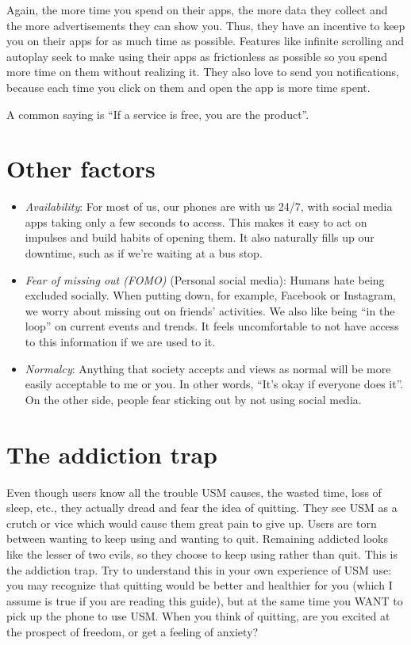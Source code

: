 \documentclass[
  openany]{book}
\providecommand{\tightlist}{%
  \setlength{\itemsep}{0pt}\setlength{\parskip}{0pt}}
\begin{document}
Again, the more time you spend on their apps, the more data they collect and the more advertisements they can show you. Thus, they have an incentive to keep you on their apps for as much time as possible. Features like infinite scrolling and autoplay seek to make using their apps as frictionless as possible so you spend more time on them without realizing it. They also love to send you notifications, because each time you click on them and open the app is more time spent.

A common saying is ``If a service is free, you are the product''.

\section{Other factors}\label{other-factors}

\begin{itemize}
\tightlist
\item
  \emph{Availability}: For most of us, our phones are with us 24/7, with social media apps taking only a few seconds to access. This makes it easy to act on impulses and build habits of opening them. It also naturally fills up our downtime, such as if we're waiting at a bus stop.
\item
  \emph{Fear of missing out (FOMO)} (Personal social media): Humans hate being excluded socially. When putting down, for example, Facebook or Instagram, we worry about missing out on friends' activities. We also like being ``in the loop'' on current events and trends. It feels uncomfortable to not have access to this information if we are used to it.
\item
  \emph{Normalcy}: Anything that society accepts and views as normal will be more easily acceptable to me or you. In other words, ``It's okay if everyone does it''. On the other side, people fear sticking out by not using social media.
\end{itemize}

\section{The addiction trap}\label{the-addiction-trap}

Even though users know all the trouble USM causes, the wasted time, loss of sleep, etc., they actually dread and fear the idea of quitting. They see USM as a crutch or vice which would cause them great pain to give up. Users are torn between wanting to keep using and wanting to quit. Remaining addicted looks like the lesser of two evils, so they choose to keep using rather than quit. This is the addiction trap. Try to understand this in your own experience of USM use: you may recognize that quitting would be better and healthier for you (which I assume is true if you are reading this guide), but at the same time you WANT to pick up the phone to use USM. When you think of quitting, are you excited at the prospect of freedom, or get a feeling of anxiety?
\end{document}
